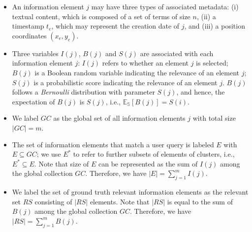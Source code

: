 \begin{itemize}
\item An information element $j$ may have three types of associated metadata: (i) textual content, which is composed of a set of terms of size $n$, (ii) a timestamp $t_e$, which may represent the creation date of $j$, and (iii) a position coordinates $(x_{e},y_{e})$.
\item Three variables $I(j)$, $B(j)$ and $S(j)$ are associated with each information element $j$: $I(j)$ refers to whether an element $j$ is selected; $B(j)$ is a Boolean random variable indicating the relevance of an element $j$; $S(j)$ is a probabilistic score indicating the relevance of an element $j$. %
$B(j)$ follows a \emph{Bernoulli} distribution with parameter $S(j)$, and hence, the expectation of $B(j)$ is $S(j)$, i.e., 
  $\mathbb{E_S}[B(j)] = S(i)$.
\item We label $GC$ as the global set of all information elements $j$ with total size $|GC|=m$. %
\item The set of information elements that match a user query is labeled $E$ with $E \subseteq  GC$; we use $E^*$ to refer to further subsets of elements of clusters, i.e., $E^*\subseteq E$. 
Note that size of $E$ can be represented as the sum of $I(j)$ among the global collection $GC$. Therefore, we have $|E| = \sum_{j=1}^m I(j)$.
\item We label the set of ground truth relevant information elements as the relevant set $RS$ consisting of $|RS|$ elements. 
Note that $|RS|$ is equal to the sum of $B(j)$ among the global collection $GC$. Therefore, we have $|RS| = \sum_{j=1}^m B(j)$. %


\end{itemize}
